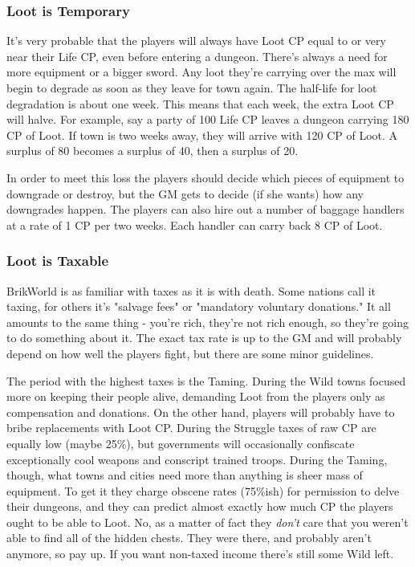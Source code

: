 \documentclass[12pt,a4paper,twocolumn]{article}
\begin{document}
\subsubsection{Loot is Temporary}

It's very probable that the players will always have Loot CP equal to or very near their Life CP, even before entering a dungeon.  There's always a need for more equipment or a bigger sword.  Any loot they're carrying over the max will begin to degrade as soon as they leave for town again.  The half-life for loot degradation is about one week.  This means that each week, the extra Loot CP will halve.  For example, say a party of 100 Life CP leaves a dungeon carrying 180 CP of Loot.  If town is two weeks away, they will arrive with 120 CP of Loot.  A surplus of 80 becomes a surplus of 40, then a surplus of 20.  

In order to meet this loss the players should decide which pieces of equipment to downgrade or destroy, but the GM gets to decide (if she wants) how any downgrades happen.  The players can also hire out a number of baggage handlers at a rate of 1 CP per two weeks.  Each handler can carry back 8 CP of Loot.

\subsubsection{Loot is Taxable}

BrikWorld is as familiar with taxes as it is with death.  Some nations call it taxing, for others it's "salvage fees" or "mandatory voluntary donations."  It all amounts to the same thing - you're rich, they're not rich enough, so they're going to do something about it.  The exact tax rate is up to the GM and will probably depend on how well the players fight, but there are some minor guidelines. 

The period with the highest taxes is the Taming.  During the Wild towns focused more on keeping their people alive, demanding Loot from the players only as compensation and donations.  On the other hand, players will probably have to bribe replacements with Loot CP.  During the Struggle taxes of raw CP are equally low (maybe 25\%), but governments will occasionally confiscate exceptionally cool weapons and conscript trained troops.  During the Taming, though, what towns and cities need more than anything is sheer mass of equipment.  To get it they charge obscene rates (75\%ish) for permission to delve their dungeons, and they can predict almost exactly how much CP the players ought to be able to Loot.  No, as a matter of fact they {\it don't} care that you weren't able to find all of the hidden chests.  They were there, and probably aren't anymore, so pay up.  If you want non-taxed income there's still some Wild left.
\end{document}
